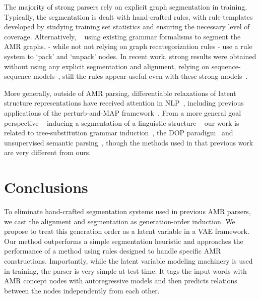 \documentclass[11pt]{article}
\begin{document}
The majority of strong parsers rely on explicit graph segmentation in training. 
Typically, the segmentation is dealt with hand-crafted rules, with rule templates
developed by studying training set statistics and ensuring the necessary level of coverage. Alternatively, ~ using existing grammar formalisms to segment the AMR graphs.  - while not not relying on graph recategorization rules -  use a rule system to `pack' and `unpack' nodes. In recent work,  strong results were obtained without using any explicit segmentation and alignment, relying on sequence-sequence models~\cite{Xu2020ImprovingAP,Cai2020AMRPV}, still the rules appear useful even with these strong models~\cite{Cai2020AMRPV}.  




 
More generally, outside of AMR parsing, differentiable relaxations of latent structure representations have received attention in NLP~\cite{kim2017structured,liu2018learning}, including previous applications of the perturb-and-MAP framework~\cite{Corro2019DifferentiablePS}. From a more general goal perspective -- inducing a segmentation of a linguistic structure -- our work is related to tree-substitution grammar induction~\cite{sima1995cient,cohn2010inducing}, the DOP paradigm~\cite{bod2003data} and unsupervised semantic parsing~\cite{poon2009unsupervised,titov2011bayesian}, though the methods used in that previous work are very different from ours.
 



\section{Conclusions} To eliminate hand-crafted segmentation systems used in previous AMR parsers, we cast the alignment and segmentation as generation-order induction. We propose to treat this generation order as a latent variable in a VAE framework. Our method outperforms a simple segmentation heuristic and approaches the performance of a method using rules designed to handle specific AMR constructions.   Importantly, while the latent variable modeling machinery is used in training, the parser is very simple at test time. It tags the input words with AMR concept nodes with autoregressive models and then predicts relations between the nodes independently from each other.  
\end{document}
